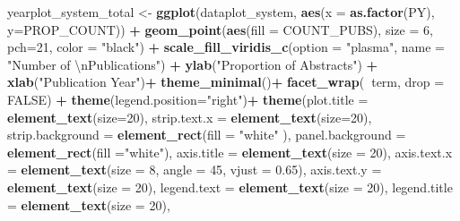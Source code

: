\documentclass[
]{article}
\newenvironment{Shaded}{\begin{snugshade}}{\end{snugshade}}
\newcommand{\CharTok}[1]{\textcolor[rgb]{0.31,0.60,0.02}{#1}}
\newcommand{\DataTypeTok}[1]{\textcolor[rgb]{0.13,0.29,0.53}{#1}}
\newcommand{\DecValTok}[1]{\textcolor[rgb]{0.00,0.00,0.81}{#1}}
\newcommand{\FloatTok}[1]{\textcolor[rgb]{0.00,0.00,0.81}{#1}}
\newcommand{\KeywordTok}[1]{\textcolor[rgb]{0.13,0.29,0.53}{\textbf{#1}}}
\newcommand{\NormalTok}[1]{#1}
\newcommand{\OperatorTok}[1]{\textcolor[rgb]{0.81,0.36,0.00}{\textbf{#1}}}
\newcommand{\OtherTok}[1]{\textcolor[rgb]{0.56,0.35,0.01}{#1}}
\newcommand{\StringTok}[1]{\textcolor[rgb]{0.31,0.60,0.02}{#1}}
\begin{document}
\begin{Shaded}
\begin{Highlighting}[]
\NormalTok{yearplot_system_total <-}\StringTok{  }\KeywordTok{ggplot}\NormalTok{(dataplot_system, }\KeywordTok{aes}\NormalTok{(}\DataTypeTok{x =} \KeywordTok{as.factor}\NormalTok{(PY), }\DataTypeTok{y=}\NormalTok{PROP_COUNT)) }\OperatorTok{+}
\StringTok{  }\KeywordTok{geom_point}\NormalTok{(}\KeywordTok{aes}\NormalTok{(}\DataTypeTok{fill =}\NormalTok{ COUNT_PUBS), }\DataTypeTok{size =} \DecValTok{6}\NormalTok{, }\DataTypeTok{pch=}\DecValTok{21}\NormalTok{, }\DataTypeTok{color =} \StringTok{"black"}\NormalTok{) }\OperatorTok{+}
\StringTok{  }\KeywordTok{scale_fill_viridis_c}\NormalTok{(}\DataTypeTok{option =} \StringTok{"plasma"}\NormalTok{, }
                       \DataTypeTok{name =} \StringTok{"Number of }\CharTok{\textbackslash{}n}\StringTok{Publications"}\NormalTok{) }\OperatorTok{+}
\StringTok{  }\KeywordTok{ylab}\NormalTok{(}\StringTok{"Proportion of Abstracts"}\NormalTok{) }\OperatorTok{+}\StringTok{ }
\StringTok{  }\KeywordTok{xlab}\NormalTok{(}\StringTok{"Publication Year"}\NormalTok{)}\OperatorTok{+}
\StringTok{  }\KeywordTok{theme_minimal}\NormalTok{()}\OperatorTok{+}
\StringTok{  }\KeywordTok{facet_wrap}\NormalTok{(}\OperatorTok{~}\NormalTok{term, }\DataTypeTok{drop =} \OtherTok{FALSE}\NormalTok{) }\OperatorTok{+}
\StringTok{  }\KeywordTok{theme}\NormalTok{(}\DataTypeTok{legend.position=}\StringTok{"right"}\NormalTok{)}\OperatorTok{+}
\StringTok{  }\KeywordTok{theme}\NormalTok{(}\DataTypeTok{plot.title =} \KeywordTok{element_text}\NormalTok{(}\DataTypeTok{size=}\DecValTok{20}\NormalTok{),}
        \DataTypeTok{strip.text.x =} \KeywordTok{element_text}\NormalTok{(}\DataTypeTok{size=}\DecValTok{20}\NormalTok{),}
        \DataTypeTok{strip.background =} \KeywordTok{element_rect}\NormalTok{(}\DataTypeTok{fill =} \StringTok{"white"}\NormalTok{ ),}
        \DataTypeTok{panel.background =} \KeywordTok{element_rect}\NormalTok{(}\DataTypeTok{fill =}\StringTok{"white"}\NormalTok{),}
        \DataTypeTok{axis.title =} \KeywordTok{element_text}\NormalTok{(}\DataTypeTok{size =} \DecValTok{20}\NormalTok{),}
        \DataTypeTok{axis.text.x =} \KeywordTok{element_text}\NormalTok{(}\DataTypeTok{size =} \DecValTok{8}\NormalTok{, }\DataTypeTok{angle =} \DecValTok{45}\NormalTok{, }\DataTypeTok{vjust =} \FloatTok{0.65}\NormalTok{),}
        \DataTypeTok{axis.text.y =} \KeywordTok{element_text}\NormalTok{(}\DataTypeTok{size =} \DecValTok{20}\NormalTok{),}
        \DataTypeTok{legend.text =} \KeywordTok{element_text}\NormalTok{(}\DataTypeTok{size =} \DecValTok{20}\NormalTok{),}
        \DataTypeTok{legend.title =} \KeywordTok{element_text}\NormalTok{(}\DataTypeTok{size =} \DecValTok{20}\NormalTok{),}

\end{Highlighting}
\end{Shaded}
\end{document}
